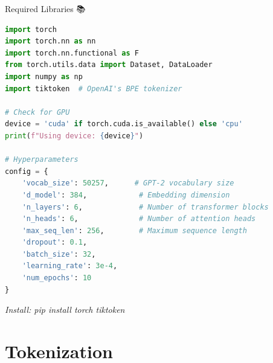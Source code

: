 \documentclass[aspectratio=169]{beamer}
\begin{document}
\begin{frame}[fragile]{Required Libraries 📚}
\begin{lstlisting}[language=Python]
import torch
import torch.nn as nn
import torch.nn.functional as F
from torch.utils.data import Dataset, DataLoader
import numpy as np
import tiktoken  # OpenAI's BPE tokenizer

# Check for GPU
device = 'cuda' if torch.cuda.is_available() else 'cpu'
print(f"Using device: {device}")

# Hyperparameters
config = {
    'vocab_size': 50257,      # GPT-2 vocabulary size
    'd_model': 384,            # Embedding dimension
    'n_layers': 6,             # Number of transformer blocks
    'n_heads': 6,              # Number of attention heads
    'max_seq_len': 256,        # Maximum sequence length
    'dropout': 0.1,
    'batch_size': 32,
    'learning_rate': 3e-4,
    'num_epochs': 10
}
\end{lstlisting}

\vspace{0.3cm}
\small
\textit{Install: pip install torch tiktoken}
\end{frame}

\section{Tokenization}
\end{document}
